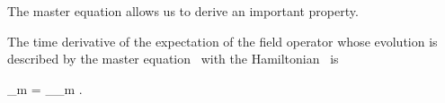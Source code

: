 The master equation allows us to derive an important property.

\begin{theorem}
	The time derivative of the expectation of the field operator whose evolution is described by the master equation~ with the Hamiltonian~ is
	\begin{eqn*}
		 \langle \Psiop_m \rangle
		= _{\restbasis_m} .
	\end{eqn*}
\end{theorem}
